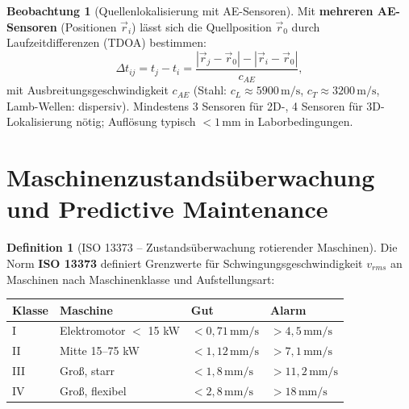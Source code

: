 ﻿\documentclass[a4paper,12pt]{report}
\theoremstyle{definition}
\newtheorem{definition}{Definition}
\newtheorem{beobachtung}{Beobachtung}
\begin{document}
\begin{beobachtung}[Quellenlokalisierung mit AE-Sensoren]
Mit \textbf{mehreren AE-Sensoren} (Positionen $\vec{r}_i$) lässt sich
die Quellposition $\vec{r}_0$ durch Laufzeitdifferenzen (TDOA) bestimmen:
\[
  \Delta t_{ij} = t_j - t_i = \frac{|\vec{r}_j - \vec{r}_0| - |\vec{r}_i - \vec{r}_0|}{c_{AE}},
\]
mit Ausbreitungsgeschwindigkeit $c_{AE}$ (Stahl: $c_L \approx 5900\,\mathrm{m/s}$,
$c_T \approx 3200\,\mathrm{m/s}$, Lamb-Wellen: dispersiv).
Mindestens 3 Sensoren für 2D-, 4 Sensoren für 3D-Lokalisierung nötig;
Auflösung typisch $< 1\,\mathrm{mm}$ in Laborbedingungen.
\end{beobachtung}

\section{Maschinenzustandsüberwachung und Predictive Maintenance}

\begin{definition}[ISO 13373 -- Zustandsüberwachung rotierender Maschinen]
Die Norm \textbf{ISO 13373} definiert Grenzwerte für Schwingungsgeschwindigkeit
$v_{rms}$ an Maschinen nach Maschinenklasse und Aufstellungsart:
\begin{center}
\begin{tabular}{llll}
\toprule
Klasse & Maschine & Gut & Alarm \\
\midrule
I & Elektromotor $<$ 15 kW & $< 0{,}71\,\mathrm{mm/s}$ & $> 4{,}5\,\mathrm{mm/s}$ \\
II & Mitte 15--75 kW & $< 1{,}12\,\mathrm{mm/s}$ & $> 7{,}1\,\mathrm{mm/s}$ \\
III & Groß, starr & $< 1{,}8\,\mathrm{mm/s}$ & $> 11{,}2\,\mathrm{mm/s}$ \\
IV & Groß, flexibel & $< 2{,}8\,\mathrm{mm/s}$ & $> 18\,\mathrm{mm/s}$ \\
\bottomrule
\end{tabular}
\end{center}
\end{definition}
\end{document}

